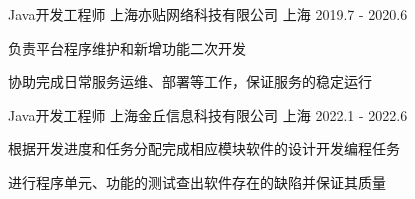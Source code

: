 

\begin{cventries}

  \cventry
    {Java开发工程师} %
    {上海亦贴网络科技有限公司} %
    {上海} %
    {2019.7 - 2020.6} %
    {
      \begin{cvitems} %
      	\item {负责平台程序维护和新增功能二次开发}
     	\item {协助完成日常服务运维、部署等工作，保证服务的稳定运行}
      \end{cvitems}
    }
  \cventry
	{Java开发工程师} %
	{上海金丘信息科技有限公司} %
	{上海} %
	{2022.1 - 2022.6} %
{
	\begin{cvitems} %
		\item {根据开发进度和任务分配完成相应模块软件的设计开发编程任务}
		\item {进行程序单元、功能的测试查出软件存在的缺陷并保证其质量}
	\end{cvitems}
}


\end{cventries}
